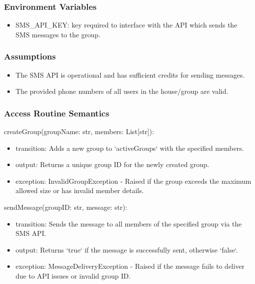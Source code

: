 \documentclass[12pt, titlepage]{article}
\begin{document}
\subsubsection{Environment Variables}

\begin{itemize}
\item SMS\_API\_KEY: key required to interface with the API which sends the SMS messages to the group.
\end{itemize}

\subsubsection{Assumptions}

\begin{itemize}
  \item The SMS API is operational and has sufficient credits for sending messages.
  \item The provided phone numbers of all users in the house/group are valid.
\end{itemize}

\subsubsection{Access Routine Semantics}

\noindent createGroup(groupName: str, members: List[str]):
\begin{itemize}
\item transition: Adds a new group to `activeGroups` with the specified members.
\item output: Returns a unique group ID for the newly created group.
\item exception: InvalidGroupException - Raised if the group exceeds the maximum allowed size or has invalid member details.
\end{itemize}

\noindent sendMessage(groupID: str, message: str):
\begin{itemize}
\item transition: Sends the message to all members of the specified group via the SMS API.
\item output: Returns `true` if the message is successfully sent, otherwise `false`.
\item exception: MessageDeliveryException - Raised if the message fails to deliver due to API issues or invalid group ID.
\end{itemize}
\end{document}
